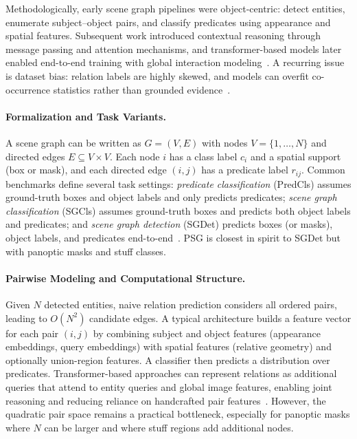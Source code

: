 Methodologically, early scene graph pipelines were object-centric: detect entities, enumerate subject--object pairs, and classify predicates using appearance and spatial features. Subsequent work introduced contextual reasoning through message passing and attention mechanisms, and transformer-based models later enabled end-to-end training with global interaction modeling~\citep{li2022sgtr, shit2022relationformer, cong2023reltr}. A recurring issue is dataset bias: relation labels are highly skewed, and models can overfit co-occurrence statistics rather than grounded evidence~\citep{zellers2018neural}.

\paragraph{Formalization and Task Variants.}
A scene graph can be written as $G=(V,E)$ with nodes $V=\{1,\dots,N\}$ and directed edges $E\subseteq V\times V$. Each node $i$ has a class label $c_i$ and a spatial support (box or mask), and each directed edge $(i,j)$ has a predicate label $r_{ij}$. Common benchmarks define several task settings: \emph{predicate classification} (PredCls) assumes ground-truth boxes and object labels and only predicts predicates; \emph{scene graph classification} (SGCls) assumes ground-truth boxes and predicts both object labels and predicates; and \emph{scene graph detection} (SGDet) predicts boxes (or masks), object labels, and predicates end-to-end~\citep{cheng2022visual, zhu2022scene}. PSG is closest in spirit to SGDet but with panoptic masks and stuff classes.

\paragraph{Pairwise Modeling and Computational Structure.}
Given $N$ detected entities, naive relation prediction considers all ordered pairs, leading to $O(N^2)$ candidate edges. A typical architecture builds a feature vector for each pair $(i,j)$ by combining subject and object features (appearance embeddings, query embeddings) with spatial features (relative geometry) and optionally union-region features. A classifier then predicts a distribution over predicates. Transformer-based approaches can represent relations as additional queries that attend to entity queries and global image features, enabling joint reasoning and reducing reliance on handcrafted pair features~\citep{cong2023reltr, shit2022relationformer}. However, the quadratic pair space remains a practical bottleneck, especially for panoptic masks where $N$ can be larger and where stuff regions add additional nodes.

